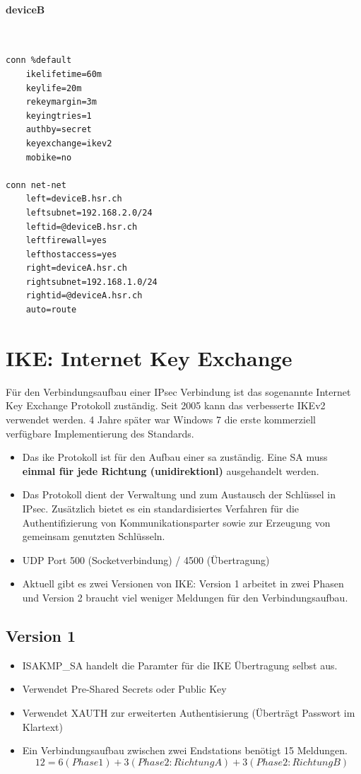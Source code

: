 \paragraph{deviceB} \hfill \\
\begin{lstlisting}
conn %default
	ikelifetime=60m
	keylife=20m
	rekeymargin=3m
	keyingtries=1
	authby=secret
	keyexchange=ikev2
	mobike=no

conn net-net
	left=deviceB.hsr.ch
	leftsubnet=192.168.2.0/24
	leftid=@deviceB.hsr.ch
	leftfirewall=yes
	lefthostaccess=yes
	right=deviceA.hsr.ch
	rightsubnet=192.168.1.0/24
	rightid=@deviceA.hsr.ch
	auto=route
\end{lstlisting}





\section{IKE: Internet Key Exchange}\label{sec:ike}
Für den Verbindungsaufbau einer IPsec Verbindung ist das sogenannte Internet Key Exchange Protokoll zuständig. Seit 2005 kann das verbesserte IKEv2 verwendet werden. 4 Jahre später war Windows 7 die erste kommerziell verfügbare Implementierung des Standards.
\begin{itemize}
	\item Das \gls{ike} Protokoll ist für den Aufbau einer \gls{sa} zuständig. Eine SA muss \textbf{einmal für jede Richtung (unidirektionl)} ausgehandelt werden.
	\item Das Protokoll dient der Verwaltung und zum Austausch der Schlüssel in IPsec. Zusätzlich bietet es ein standardisiertes Verfahren für die Authentifizierung von Kommunikationsparter sowie zur Erzeugung von gemeinsam genutzten Schlüsseln.
	\item UDP Port 500 (Socketverbindung) / 4500 (Übertragung)
	\item Aktuell gibt es zwei Versionen von IKE: Version 1 arbeitet in zwei Phasen und Version 2 braucht viel weniger Meldungen für den Verbindungsaufbau. 
\end{itemize}

\subsection{Version 1}
\begin{itemize}
	\item ISAKMP\_SA handelt die Paramter für die IKE Übertragung selbst aus.
	\item Verwendet Pre-Shared Secrets oder Public Key
	\item Verwendet XAUTH zur erweiterten Authentisierung (Überträgt Passwort im Klartext)
	\item Ein Verbindungsaufbau zwischen zwei Endstations benötigt 15 Meldungen.
	\[
	12 = 6 (Phase 1) + 3 (Phase 2: Richtung A) + 3 (Phase 2: Richtung B)
	\]
\end{itemize}

